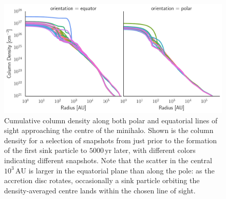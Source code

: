 \documentclass{thesis}
\newcommand{\au}{\ensuremath{\,\mathrm{AU}}\xspace}
\newcommand{\yr}{\ensuremath{\,\mathrm{yr}}\xspace}
\begin{document}
\begin{figure}
\begin{center}
\includegraphics[width=\columnwidth]{figures/optical_depth/column_density}
\caption{\label{fig:column_density} Cumulative column density along both polar and equatorial lines of sight approaching the centre of the minihalo.  Shown is the column density for a selection of snapshots from just prior to the formation of the first sink particle to $5000\yr$ later, with different colors indicating different snapshots.  Note that the scatter in the central $10^3\au$ is larger in the equatorial plane than along the pole: as the accretion disc rotates, occasionally a sink particle orbiting the density-averaged centre lands within the chosen line of sight.}
\end{center}
\end{figure}

\end{document}
